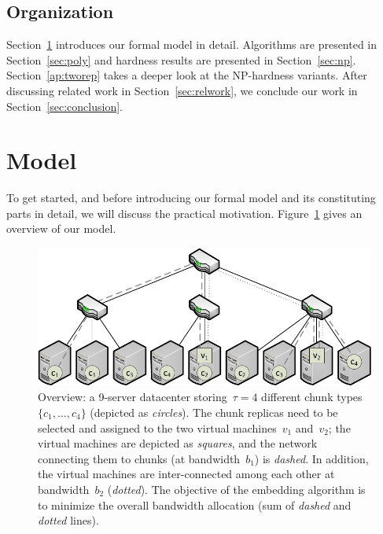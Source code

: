 \documentclass[preprint,12pt]{elsarticle}
\newcommand{\CostTrans}{\ensuremath{b_1}}
\newcommand{\CostCom}{\ensuremath{b_2}}
\begin{document}
\subsection{Organization}

Section~\ref{sec:model} introduces our formal model in detail.
Algorithms are presented in Section~\ref{sec:poly} and
hardness results are presented in Section~\ref{sec:np}.
Section~\ref{ap:tworep} takes a deeper look
at the NP-hardness variants.
After discussing related work in Section~\ref{sec:relwork},
we conclude our work in Section~\ref{sec:conclusion}.

\section{Model}\label{sec:model}

To get started, and before introducing our formal model and its constituting parts in detail,
we will discuss the practical motivation.
Figure~\ref{fig:overview} gives an overview of our model.

\begin{figure}[t]
\centering
\includegraphics[width=0.79\columnwidth]{figs/data_locality_no_legend.pdf}
\caption{Overview: a 9-server datacenter storing~$\tau=4$ different chunk
types~$\{c_1,\ldots,c_4\}$ (depicted as \emph{circles}). The chunk replicas need to be selected and assigned to the two
 virtual machines~$v_1$ and~$v_2$; the virtual machines are depicted as \emph{squares}, and
 the network connecting them to chunks (at bandwidth~$\CostTrans$) is \emph{dashed}. In addition, the virtual machines are inter-connected among
 each other at bandwidth~$\CostCom$ (\emph{dotted}). The objective of the embedding algorithm is to minimize the overall bandwidth allocation
 (sum of \emph{dashed} and \emph{dotted} lines).}\label{fig:overview}
\vspace{-1em}
\end{figure}
\end{document}

